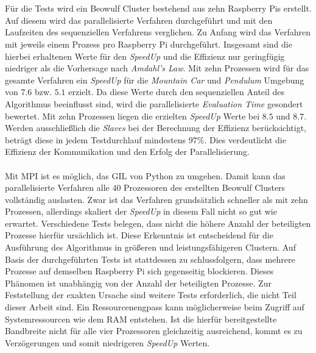\\\\
Für die Tests wird ein Beowulf Cluster bestehend aus zehn Raspberry Pis erstellt. Auf diesem wird das parallelisierte Verfahren durchgeführt und mit den Laufzeiten des sequenziellen Verfahrens verglichen. Zu Anfang wird das Verfahren mit jeweils einem Prozess pro Raspberry Pi durchgeführt. Insgesamt sind die hierbei erhaltenen Werte für den \emph{SpeedUp} und die Effizienz nur geringfügig niedriger als die Vorhersage nach \emph{Amdahl's Law}. Mit zehn Prozessen wird für das gesamte Verfahren ein \emph{SpeedUp} für die \emph{Mountain Car} und \emph{Pendulum} Umgebung von $7.6$ bzw. $5.1$ erzielt. Da diese Werte durch den sequenziellen Anteil des Algorithmus beeinflusst sind, wird die parallelisierte \emph{Evaluation Time} gesondert bewertet. Mit zehn Prozessen liegen die erzielten \emph{SpeedUp} Werte bei $8.5$ und $8.7$. Werden ausschließlich die \emph{Slaves} bei der Berechnung der Effizienz berücksichtigt, beträgt diese in jedem Testdurchlauf mindestens $97\%$. Dies verdeutlicht die Effizienz der Kommunikation und den Erfolg der Parallelisierung.
\\\\
Mit \ac{MPI} ist es möglich, das \ac{GIL} von Python zu umgehen. Damit kann das parallelisierte Verfahren alle $40$ Prozessoren des erstellten Beowulf Clusters vollständig auslasten. Zwar ist das Verfahren grundsätzlich schneller als mit zehn Prozessen, allerdings skaliert der \emph{SpeedUp} in diesem Fall nicht so gut wie erwartet. Verschiedene Tests belegen, dass nicht die höhere Anzahl der beteiligten Prozesse hierfür ursächlich ist. Diese Erkenntnis ist entscheidend für die Ausführung des Algorithmus in größeren und leistungsfähigeren Clustern. Auf Basis der durchgeführten Tests ist stattdessen zu schlussfolgern, dass mehrere Prozesse auf demselben Raspberry Pi sich gegenseitig blockieren. Dieses Phänomen ist unabhängig von der Anzahl der beteiligten Prozesse. Zur Feststellung der exakten Ursache sind weitere Tests erforderlich, die nicht Teil dieser Arbeit sind. Ein Ressourcenengpass kann möglicherweise beim Zugriff auf Systemressourcen wie dem \ac{RAM} entstehen. Ist die hierfür bereitgestellte Bandbreite nicht für alle vier Prozessoren gleichzeitig ausreichend, kommt es zu Verzögerungen und somit niedrigeren \emph{SpeedUp} Werten. 
\\\\
